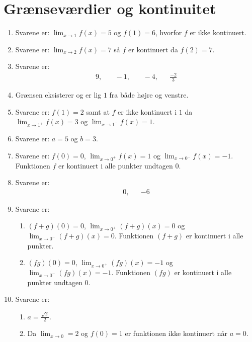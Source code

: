 \newpage
\section{Grænseværdier og kontinuitet}
\begin{enumerate}
	\item Svarene er: $\lim_{x\to 1}f(x)=5$ og $f(1)=6$, hvorfor $f$ er ikke kontinuert.
	
	
	\item Svarene er: $\lim_{x\to 2}f(x)=7$ så $f$ er kontinuert da $ f(2)=7 $.

	
	
	\item Svarene er:
	\begin{align*}
	9,&& \ -1,&&\ -4,&& \frac{-2}{3}
	\end{align*}
	


	
	
	\item Grænsen eksisterer og er lig $1$ fra både højre og venstre.
	
	\item Svarene er: $f(1)=2$ samt at $f$ er ikke kontinuert i $1$ da $\lim_{x\to 1^+}f(x)=3$ og $\lim_{x\to 1^-}f(x)=1$.
	
	
	\item Svarene er: $a=5$ og $b=3$.
	
	\item\label{it:lim2ans} Svarene er: $ f(0) =0$, $ \lim_{x\to 0^+}f(x)=1 $ og $\lim_{x\to 0^-}f(x)=-1$. Funktionen $f$ er kontinuert i alle punkter undtagen $0$.
	
	\item Svarene er:
	\begin{align*}
	0,&& -6
	\end{align*}
	
	\item Svarene er: 
	\begin{enumerate}
		\item $ (f+g)(0)=0$, $ \lim_{x\to 0^+}(f+g)(x)=0 $ og $\lim_{x\to 0^-}(f+g)(x)=0$. Funktionen $(f+g)$ er kontinuert i alle punkter.
		\item $ (fg)(0) =0$, $ \lim_{x\to 0^+}(fg)(x) =-1$ og $\lim_{x\to 0^-}(fg)(x)=-1$. Funktionen $(fg)$ er kontinuert i alle punkter undtagen $0$.
	\end{enumerate}
	
	\item Svarene er:
	\begin{enumerate}
		\item $a=\frac{\sqrt{2}}{2}$.
		\item Da $\lim_{x\to 0}=2$ og $f(0)=1$ er funktionen ikke kontinuert når $a=0$.
	\end{enumerate}


\end{enumerate}
